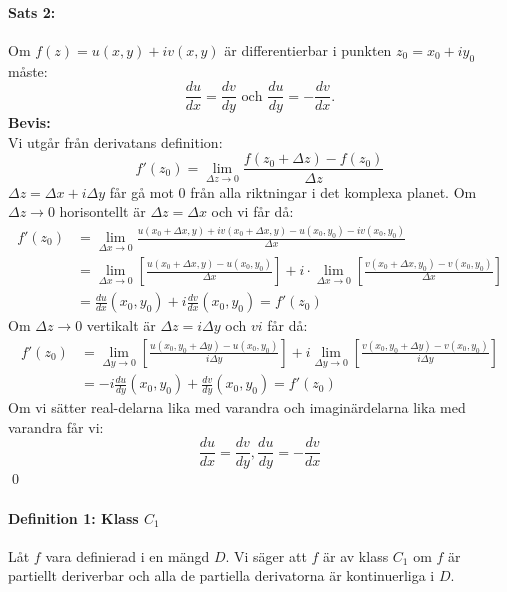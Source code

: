 \documentclass{article}%
\begin{document}
\paragraph{Sats 2:}
Om $f(z) = u(x, y) + iv(x, y)$ är differentierbar i punkten $z_0 = x_0 + iy_0$ måste:
$$\frac {d u} {d x} = \frac {d v} {d y} 
	\text{ och } \frac {d u} {d y} = - \frac {d v} {d x}.$$
{\bf Bevis:}
\\
Vi utgår från derivatans definition:
$$f'(z_0) = \lim_{\Delta z \to 0} \frac {f(z_0 + \Delta z) - f(z_0)} {\Delta z} $$
$\Delta z = \Delta x + i \Delta y$ får gå mot $0$ från alla riktningar i det komplexa planet.
Om $\Delta z \to 0$ horisontellt är $\Delta z = \Delta x$ och vi får då:
\begin{align*}
	f'(z_0) &=  \lim_{\Delta x \to 0} \frac {u(x_0 + \Delta x, y) + iv(x_0 + \Delta x, y) - u(x_0, y_0) - iv(x_0, y_0)} {\Delta x} \\
		&= \lim_{\Delta x \to 0} \left [ \frac {u(x_0 + \Delta x, y) - u(x_0, y_0)} {\Delta x} \right ] + i \cdot \lim_{\Delta x \to 0} \left [ \frac {v(x_0 + \Delta x, y_0) - v(x_0, y_0)} {\Delta x} \right ] \\
	&= \frac {d u} {d x} (x_0, y_0) + i \frac {d v} {d x} (x_0, y_0) = f'(z_0)
\end{align*}
Om $\Delta z \to 0$ vertikalt är $\Delta z = i \Delta y$ och $vi$ får då:
\begin{align*}
	f'(z_0) &= \lim_{\Delta y \to 0} \left [ \frac {u(x_0, y_0  + \Delta y) - u(x_0, y_0)} {i \Delta y} \right ] +
		i \lim_{\Delta y \to 0} \left [ \frac {v(x_0, y_0 + \Delta y) - v(x_0, y_0)} {i \Delta y} \right ] \\
	&= - i \frac {d u} {d y} (x_0, y_0) + \frac {d v} {d y} (x_0, y_0) = f'(z_0)
\end{align*}
Om vi sätter real-delarna lika med varandra och imaginärdelarna lika med varandra får vi:
$$\frac {d u} {d x} = \frac {d v} {d y}, \frac {d u} {d y} = -
	\frac {d v} {d x}$$
\hfill \qed

\paragraph{Definition 1: Klass $C_1$}
Låt $f$ vara definierad i en mängd $D$. Vi säger att $f$ är av klass $C_1$ om $f$ är partiellt deriverbar och
alla de partiella derivatorna är kontinuerliga i $D$.\\
\\
\end{document}
